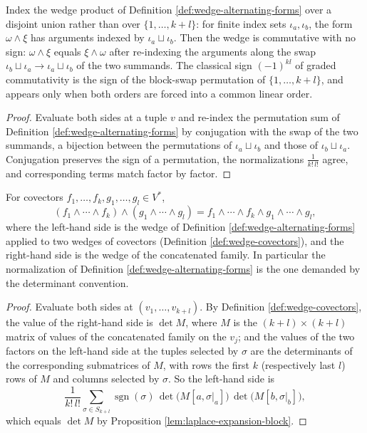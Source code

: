\begin{lemma}
\label{lem:wedge-comm-sum}
\leanok
{}
Index the wedge product of Definition \ref{def:wedge-alternating-forms} over a disjoint union rather than over $\{1, \ldots, k+l\}$: for finite index sets $\iota_a, \iota_b$, the form $\omega \wedge \xi$ has arguments indexed by $\iota_a \sqcup \iota_b$. Then the wedge is commutative with no sign: $\omega \wedge \xi$ equals $\xi \wedge \omega$ after re-indexing the arguments along the swap $\iota_b \sqcup \iota_a \to \iota_a \sqcup \iota_b$ of the two summands. The classical sign $(-1)^{kl}$ of graded commutativity is the sign of the block-swap permutation of $\{1, \ldots, k+l\}$, and appears only when both orders are forced into a common linear order.
\end{lemma}
\begin{proof}
\leanok
Evaluate both sides at a tuple $v$ and re-index the permutation sum of Definition \ref{def:wedge-alternating-forms} by conjugation with the swap of the two summands, a bijection between the permutations of $\iota_a \sqcup \iota_b$ and those of $\iota_b \sqcup \iota_a$. Conjugation preserves the sign of a permutation, the normalizations $\frac{1}{k!\,l!}$ agree, and corresponding terms match factor by factor.
\end{proof}

\begin{lemma}
\label{lem:wedge-covectors-concat}
\leanok
{}
For covectors $f_1, \ldots, f_k, g_1, \ldots, g_l \in V^*$,
\[
(f_1 \wedge \cdots \wedge f_k) \wedge (g_1 \wedge \cdots \wedge g_l) = f_1 \wedge \cdots \wedge f_k \wedge g_1 \wedge \cdots \wedge g_l,
\]
where the left-hand side is the wedge of Definition \ref{def:wedge-alternating-forms} applied to two wedges of covectors (Definition \ref{def:wedge-covectors}), and the right-hand side is the wedge of the concatenated family. In particular the normalization of Definition \ref{def:wedge-alternating-forms} is the one demanded by the determinant convention.
\end{lemma}
\begin{proof}
\leanok
{}
Evaluate both sides at $(v_1, \ldots, v_{k+l})$. By Definition \ref{def:wedge-covectors}, the value of the right-hand side is $\det M$, where $M$ is the $(k+l) \times (k+l)$ matrix of values of the concatenated family on the $v_j$; and the values of the two factors on the left-hand side at the tuples selected by $\sigma$ are the determinants of the corresponding submatrices of $M$, with rows the first $k$ (respectively last $l$) rows of $M$ and columns selected by $\sigma$. So the left-hand side is
\[
\frac{1}{k!\,l!} \sum_{\sigma \in S_{k+l}} \operatorname{sgn}(\sigma)\, \det\big(M[a, \sigma|_a]\big)\, \det\big(M[b, \sigma|_b]\big),
\]
which equals $\det M$ by Proposition \ref{lem:laplace-expansion-block}.
\end{proof}

